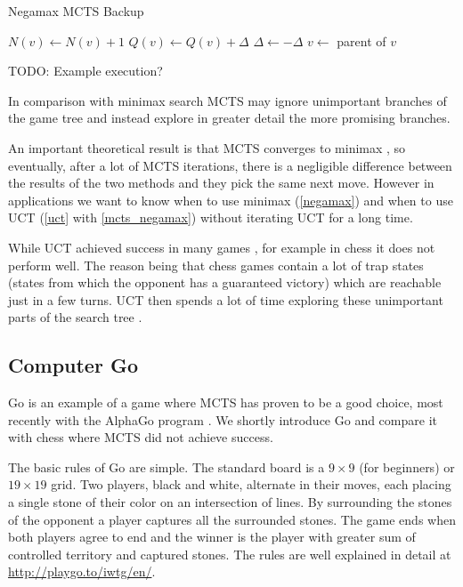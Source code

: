 \begin{algorithm}
\caption{Negamax MCTS Backup}
\label{mcts_negamax}
\begin{algorithmic}
        \State $N(v) \gets N(v) + 1$
        \State $Q(v) \gets Q(v) + \Delta$
        \State $\Delta \gets - \Delta$
        \State $v \gets $ parent of $v$
    \EndWhile
\EndFunction
\end{algorithmic}
\end{algorithm}

TODO: Example execution?


In comparison with minimax search MCTS may ignore unimportant
branches of the game tree and instead explore in greater detail the more
promising branches.

An important theoretical result is
that MCTS converges to minimax \parencite{Kocsis},
so eventually, after a lot of MCTS iterations, there is a negligible
difference between the results of the two methods and they pick the same
next move. However in
applications we want to know when to use minimax (\autoref{negamax}) and
when to use UCT (\autoref{uct} with \autoref{mcts_negamax}) without
iterating UCT for a long time.

While UCT achieved success in many games \parencite{mcts_survey},
for example in chess it does not perform well. The reason being that chess
games contain a lot of trap states (states from which the opponent
has a guaranteed victory) which are reachable just in a few turns. UCT
then spends a lot of time exploring these unimportant parts of the search
tree \parencite{mcts_vs_chess}.

\subsection{Computer Go}

Go is an example of a game where MCTS has proven to be a good choice,
most recently with the AlphaGo program \parencite{alphago}.
We shortly introduce Go and compare it with chess where MCTS did not
achieve success.

The basic rules of Go are simple. The
standard board is a $9\times9$ (for beginners) or $19 \times 19$ grid.
Two players, black and white, alternate in their moves, each
placing a single stone of their color on an intersection of lines.
By surrounding the stones of the opponent a player captures all the
surrounded stones. The game ends when both players agree to end and the
winner is the player with greater sum of controlled territory and
captured stones.
The rules are well explained in detail at
\href{http://playgo.to/iwtg/en/}{http://playgo.to/iwtg/en/}.

